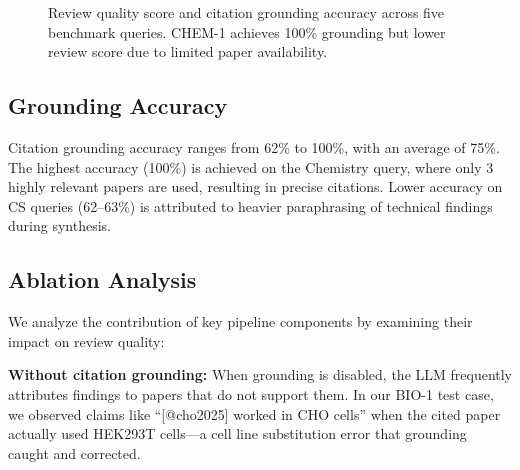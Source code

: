 \documentclass[11pt]{article}
\begin{document}
\begin{figure}[ht]
\centering
{}
\caption{Review quality score and citation grounding accuracy across five benchmark queries. CHEM-1 achieves 100\% grounding but lower review score due to limited paper availability.}
\label{fig:benchmark}
\end{figure}

\subsection{Grounding Accuracy}

Citation grounding accuracy ranges from 62\% to 100\%, with an average of 75\%. The highest accuracy (100\%) is achieved on the Chemistry query, where only 3 highly relevant papers are used, resulting in precise citations. Lower accuracy on CS queries (62--63\%) is attributed to heavier paraphrasing of technical findings during synthesis.

\subsection{Ablation Analysis}

We analyze the contribution of key pipeline components by examining their impact on review quality:

\textbf{Without citation grounding:} When grounding is disabled, the LLM frequently attributes findings to papers that do not support them. In our BIO-1 test case, we observed claims like ``[@cho2025] worked in CHO cells'' when the cited paper actually used HEK293T cells---a cell line substitution error that grounding caught and corrected.
\end{document}
